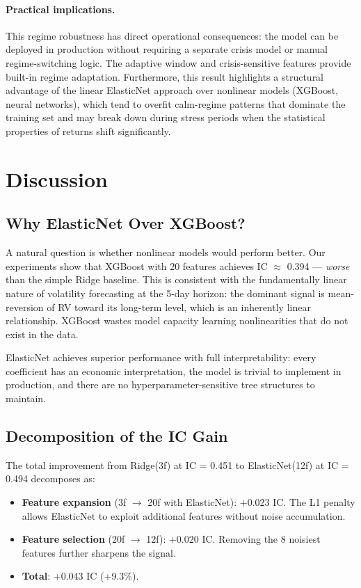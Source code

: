 \documentclass[11pt,a4paper]{article}
\begin{document}
\paragraph{Practical implications.}
This regime robustness has direct operational consequences: the model can be deployed in production without requiring a separate crisis model or manual regime-switching logic. The adaptive window and crisis-sensitive features provide built-in regime adaptation. Furthermore, this result highlights a structural advantage of the linear ElasticNet approach over nonlinear models (XGBoost, neural networks), which tend to overfit calm-regime patterns that dominate the training set and may break down during stress periods when the statistical properties of returns shift significantly.

\section{Discussion}
\label{sec:discussion}

\subsection{Why ElasticNet Over XGBoost?}

A natural question is whether nonlinear models would perform better. Our experiments show that XGBoost with 20 features achieves IC $\approx$ 0.394 --- \textit{worse} than the simple Ridge baseline. This is consistent with the fundamentally linear nature of volatility forecasting at the 5-day horizon: the dominant signal is mean-reversion of RV toward its long-term level, which is an inherently linear relationship. XGBoost wastes model capacity learning nonlinearities that do not exist in the data.

ElasticNet achieves superior performance with full interpretability: every coefficient has an economic interpretation, the model is trivial to implement in production, and there are no hyperparameter-sensitive tree structures to maintain.

\subsection{Decomposition of the IC Gain}

The total improvement from Ridge(3f) at IC = 0.451 to ElasticNet(12f) at IC = 0.494 decomposes as:

\begin{itemize}
    \item \textbf{Feature expansion} (3f $\to$ 20f with ElasticNet): +0.023 IC. The L1 penalty allows ElasticNet to exploit additional features without noise accumulation.
    \item \textbf{Feature selection} (20f $\to$ 12f): +0.020 IC. Removing the 8 noisiest features further sharpens the signal.
    \item \textbf{Total}: +0.043 IC (+9.3\%).
\end{itemize}
\end{document}
